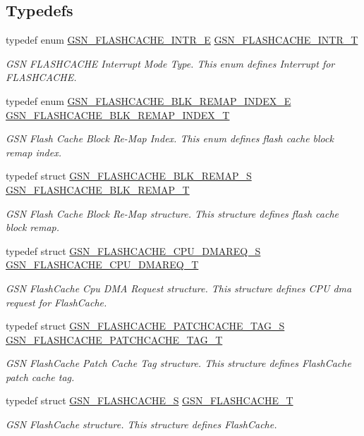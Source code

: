\subsection*{Typedefs}
\begin{DoxyCompactItemize}
\item 
typedef enum \hyperlink{a00646_ga758188ba46d386fb37d18abf22002f9f}{GSN\_\-FLASHCACHE\_\-INTR\_\-E} \hyperlink{a00646_gae440995d29864b6ceac3862a7d41a3d9}{GSN\_\-FLASHCACHE\_\-INTR\_\-T}
\begin{DoxyCompactList}\small\item\em GSN FLASHCACHE Interrupt Mode Type. This enum defines Interrupt for FLASHCACHE. \end{DoxyCompactList}\item 
typedef enum \hyperlink{a00646_ga2fbb2a317075d9d8046e4586d991856b}{GSN\_\-FLASHCACHE\_\-BLK\_\-REMAP\_\-INDEX\_\-E} \hyperlink{a00646_ga3d33b7f8285642e9406d19bb0af79b2f}{GSN\_\-FLASHCACHE\_\-BLK\_\-REMAP\_\-INDEX\_\-T}
\begin{DoxyCompactList}\small\item\em GSN Flash Cache Block Re-\/Map Index. This enum defines flash cache block remap index. \end{DoxyCompactList}\item 
typedef struct \hyperlink{a00074}{GSN\_\-FLASHCACHE\_\-BLK\_\-REMAP\_\-S} \hyperlink{a00646_gaae9fda1c44c958d868f7cf116897bfc5}{GSN\_\-FLASHCACHE\_\-BLK\_\-REMAP\_\-T}
\begin{DoxyCompactList}\small\item\em GSN Flash Cache Block Re-\/Map structure. This structure defines flash cache block remap. \end{DoxyCompactList}\item 
typedef struct \hyperlink{a00075}{GSN\_\-FLASHCACHE\_\-CPU\_\-DMAREQ\_\-S} \hyperlink{a00646_ga83166ab55332496f41890f891c0be919}{GSN\_\-FLASHCACHE\_\-CPU\_\-DMAREQ\_\-T}
\begin{DoxyCompactList}\small\item\em GSN FlashCache Cpu DMA Request structure. This structure defines CPU dma request for FlashCache. \end{DoxyCompactList}\item 
typedef struct \hyperlink{a00076}{GSN\_\-FLASHCACHE\_\-PATCHCACHE\_\-TAG\_\-S} \hyperlink{a00646_ga72a3a7e800a6f22cbb3fa9b744a51a72}{GSN\_\-FLASHCACHE\_\-PATCHCACHE\_\-TAG\_\-T}
\begin{DoxyCompactList}\small\item\em GSN FlashCache Patch Cache Tag structure. This structure defines FlashCache patch cache tag. \end{DoxyCompactList}\item 
typedef struct \hyperlink{a00077}{GSN\_\-FLASHCACHE\_\-S} \hyperlink{a00646_gab86e11d61e9a3e75985fb1ef6a081165}{GSN\_\-FLASHCACHE\_\-T}
\begin{DoxyCompactList}\small\item\em GSN FlashCache structure. This structure defines FlashCache. \end{DoxyCompactList}\end{DoxyCompactItemize}
